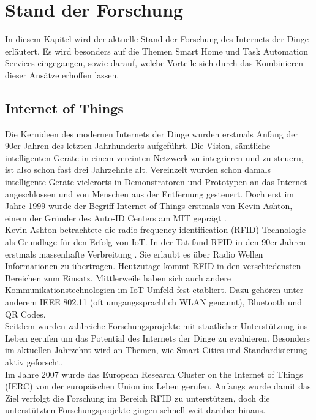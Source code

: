 \chapter{Stand der Forschung}
In diesem Kapitel wird der aktuelle Stand der Forschung des Internets der Dinge erläutert. Es wird besonders auf die Themen Smart Home und Task Automation Services eingegangen, sowie darauf, welche Vorteile sich durch das Kombinieren dieser Ansätze erhoffen lassen.


\section{Internet of Things}
Die Kernideen des modernen Internets der Dinge wurden erstmals Anfang der 90er Jahren des letzten Jahrhunderts aufgeführt. Die Vision, sämtliche intelligenten Geräte in einem vereinten Netzwerk zu integrieren und zu steuern, ist also schon fast drei Jahrzehnte alt. 
Vereinzelt wurden schon damals intelligente Geräte vielerorts in Demonstratoren und Prototypen an das Internet angeschlossen und von Menschen aus der Entfernung gesteuert. Doch erst im Jahre 1999 wurde der Begriff \glqq Internet of Things\grqq{} erstmals von Kevin Ashton, einem der Gründer des Auto-ID Centers am MIT geprägt \cite{iot_history}.\\

Kevin Ashton betrachtete die radio-frequency identification (RFID) Technologie als Grundlage für den Erfolg von IoT. In der Tat fand RFID in den 90er Jahren erstmals massenhafte Verbreitung \cite{rfid_history}. Sie erlaubt es über Radio Wellen Informationen zu übertragen. Heutzutage kommt RFID in den verschiedensten Bereichen zum Einsatz.
Mittlerweile haben sich auch andere Kommunikationstechnologien im IoT Umfeld fest etabliert. Dazu gehören unter anderem IEEE 802.11 (oft umgangssprachlich WLAN genannt), Bluetooth und QR Codes. \\

Seitdem wurden zahlreiche Forschungsprojekte mit staatlicher Unterstützung ins Leben gerufen um das Potential des Internets der Dinge zu evaluieren. Besonders im aktuellen Jahrzehnt wird an Themen, wie Smart Cities und Standardisierung aktiv geforscht.\\

Im Jahre 2007 wurde das European Research Cluster on the Internet of Things (IERC) \cite{ierc} von der europäischen Union ins Leben gerufen. Anfangs wurde damit das Ziel verfolgt die Forschung im Bereich RFID zu unterstützen, doch die unterstützten Forschungsprojekte \cite{ierc:portfolios} gingen schnell weit darüber hinaus. \\

